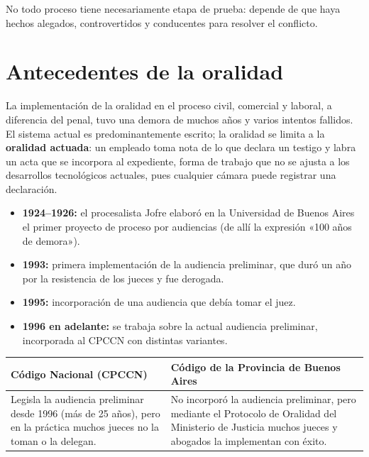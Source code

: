 \documentclass[12pt,oneside]{book}
\renewcommand{\arraystretch}{1.15}
\begin{document}
No todo proceso tiene necesariamente etapa de prueba: depende de que haya hechos alegados, controvertidos y conducentes para resolver el conflicto.

\section{Antecedentes de la oralidad}

La implementación de la oralidad en el proceso civil, comercial y laboral, a diferencia del penal, tuvo una demora de muchos años y varios intentos fallidos. El sistema actual es predominantemente escrito; la oralidad se limita a la \textbf{oralidad actuada}: un empleado toma nota de lo que declara un testigo y labra un acta que se incorpora al expediente, forma de trabajo que no se ajusta a los desarrollos tecnológicos actuales, pues cualquier cámara puede registrar una declaración.

\begin{itemize}
\item \textbf{1924--1926:} el procesalista Jofre elaboró en la Universidad de Buenos Aires el primer proyecto de proceso por audiencias (de allí la expresión «100 años de demora»).
\item \textbf{1993:} primera implementación de la audiencia preliminar, que duró un año por la resistencia de los jueces y fue derogada.
\item \textbf{1995:} incorporación de una audiencia que debía tomar el juez.
\item \textbf{1996 en adelante:} se trabaja sobre la actual audiencia preliminar, incorporada al CPCCN con distintas variantes. %
\end{itemize}

\begin{table}[H]
\centering
\renewcommand{\arraystretch}{1.25}
\begin{tabularx}{\textwidth}{>{\RaggedRight\arraybackslash}X>{\RaggedRight\arraybackslash}X}
\toprule
\textbf{Código Nacional (CPCCN)} & \textbf{Código de la Provincia de Buenos Aires} \\
\midrule
Legisla la audiencia preliminar desde 1996 (más de 25 años), pero en la práctica muchos jueces no la toman o la delegan. & No incorporó la audiencia preliminar, pero mediante el Protocolo de Oralidad del Ministerio de Justicia muchos jueces y abogados la implementan con éxito. \\
\bottomrule
\end{tabularx}
\end{table}
\end{document}

